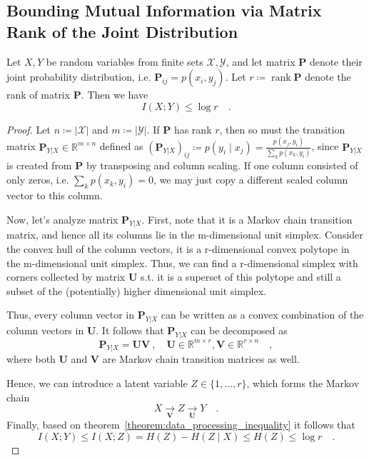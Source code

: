 \documentclass[../../main.tex]{subfiles}
\begin{document}
\subsection{Bounding Mutual Information via Matrix Rank of the Joint Distribution}
\begin{theorem}
    Let $X, Y$ be random variables from finite sets $\mathcal{X, Y}$, and let matrix $\bm{P}$ denote their joint probability distribution, i.e. $\bm{P}_{ij} = p(x_i, y_j)$. Let $r \coloneqq \operatorname{rank} \bm{P}$ denote the rank of matrix $\bm{P}$. Then we have
    \[
        I(X; Y) \leq \log r \quad .
    \]
\end{theorem}
\begin{proof}
    Let $n \coloneqq |\mathcal{X}|$ and $m \coloneqq |\mathcal{Y}|$. If $\bm{P}$ has rank $r$, then so must the transition matrix $\bm{P}_{Y|X} \in \mathbb{R}^{m \times n}$ defined as $(\bm{P}_{Y|X})_{ij} \coloneqq p(y_i \mid x_j) = \frac{p(x_j, y_i)}{\sum_{k} p(x_k, y_i)}$, since $\bm{P}_{Y|X}$ is created from $\bm{P}$ by transposing and column scaling. If one column consisted of only zeros, i.e. $\sum_{k} p(x_k, y_i) = 0$, we may just copy a different scaled column vector to this column.

    Now, let's analyze matrix $\bm{P}_{Y|X}$. First, note that it is a Markov chain transition matrix, and hence all its columns lie in the m-dimensional unit simplex. Consider the convex hull of the column vectors, it is a r-dimensional convex polytope in the m-dimensional unit simplex. Thus, we can find a r-dimensional simplex with corners collected by matrix $\bm{U}$ s.t. it is a superset of this polytope and still a subset of the (potentially) higher dimensional unit simplex. 

    Thus, every column vector in $\bm{P}_{Y|X}$ can be written as a convex combination of the column vectors in $\bm{U}$. It follows that $\bm{P}_{Y|X}$ can be decomposed as
    \[
        \bm{P}_{Y|X} = \bm{UV} \ , \quad \bm{U} \in \mathbb{R}^{m \times r}, \bm{V} \in \mathbb{R}^{r \times n} \quad ,
    \]
    where both $\bm{U}$ and $\bm{V}$ are Markov chain transition matrices as well.

    Hence, we can introduce a latent variable $Z \in \{ 1, \dots , r \}$, which forms the Markov chain
    \[
        X \underset{\bm{V}}{\to} Z \underset{\bm{U}}{\to} Y \quad .
    \]
    Finally, based on theorem~\ref{theorem:data_processing_inequality} it follows that
    \[
        I(X; Y) \leq I(X; Z) = H(Z) - H(Z \mid X) \leq H(Z) \leq \log r \quad .
    \]
\end{proof}
\end{document}
